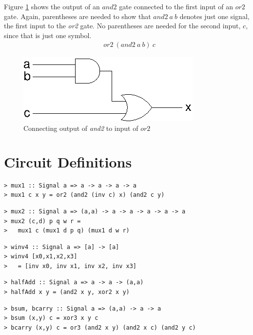 \documentclass[a4paper,openany,fleqn]{book}
\begin{document}
Figure \ref{fig:andor} shows the output of an $\mathit{and2}$ gate
connected to the first input of an $\mathit{or2}$ gate.  Again,
parentheses are needed to show that $\mathit{and2}\ a\ b$ denotes just
one signal, the first input to the \textit{or2} gate.  No parentheses
are needed for the second input, $c$, since that is just one symbol.
\begin{align*}
& \mathit{or2}\ (\mathit{and2}\ a\ b)\ c
\end{align*}

\begin{figure}[htbp]
  \begin{center}
    \includegraphics{../figures/xfig/andor.eps}
    \caption{Connecting output of \textit{and2} to input of $\mathit{or2}$}
    \label{fig:andor}
  \end{center}
\end{figure}

\section{Circuit Definitions}
\label{sec:circuit-definitions}

\begin{verbatim}
> mux1 :: Signal a => a -> a -> a -> a
> mux1 c x y = or2 (and2 (inv c) x) (and2 c y)
\end{verbatim}

\begin{verbatim}
> mux2 :: Signal a => (a,a) -> a -> a -> a -> a -> a
> mux2 (c,d) p q w r =
>   mux1 c (mux1 d p q) (mux1 d w r)
\end{verbatim}

\begin{verbatim}
> winv4 :: Signal a => [a] -> [a]
> winv4 [x0,x1,x2,x3]
>   = [inv x0, inv x1, inv x2, inv x3]
\end{verbatim}

\begin{verbatim}
> halfAdd :: Signal a => a -> a -> (a,a)
> halfAdd x y = (and2 x y, xor2 x y)
\end{verbatim}

\begin{verbatim}
> bsum, bcarry :: Signal a => (a,a) -> a -> a
> bsum (x,y) c = xor3 x y c
> bcarry (x,y) c = or3 (and2 x y) (and2 x c) (and2 y c)
\end{verbatim}
\end{document}
